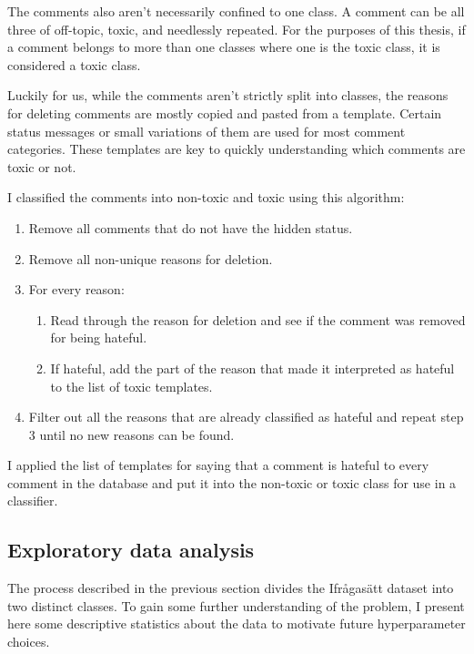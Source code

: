 \documentclass[nofilelist]{cslthse-msc}
\begin{document}
The comments also aren't necessarily confined to one class. A comment can be all three of off-topic, toxic, and needlessly repeated. For the purposes of this thesis, if a comment belongs to more than one classes where one is the toxic class, it is considered a toxic class.

Luckily for us, while the comments aren't strictly split into classes, the reasons for deleting comments are mostly copied and pasted from a template. Certain status messages or small variations of them are used for most comment categories. These templates are key to quickly understanding which comments are toxic or not.

I classified the comments into non-toxic and toxic using this algorithm:

\begin{enumerate}
    \item Remove all comments that do not have the hidden status.
    \item Remove all non-unique reasons for deletion.
    \item For every reason:
     \begin{enumerate}
         \item Read through the reason for deletion and see if the comment was removed for being hateful.
         
         \item If hateful, add the part of the reason that made it interpreted as hateful to the list of toxic templates.
     \end{enumerate}
    \item Filter out all the reasons that are already classified as hateful and repeat step 3 until no new reasons can be found.
\end{enumerate}

I applied the list of templates for saying that a comment is hateful to every comment in the database and put it into the non-toxic or toxic class for use in a classifier.

\subsection{Exploratory data analysis}

The process described in the previous section divides the Ifrågasätt dataset into two distinct classes. To gain some further understanding of the problem, I present here some descriptive statistics about the data to motivate future hyperparameter choices.
\end{document}

